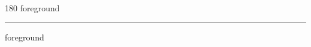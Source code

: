 
\begin{frame}
\begin{center}
\begin{turn}{180}
{\fontsize{2.5cm}{1em}\selectfont foreground}
\end{turn}
\vspace{1em}\par  
\hrule
\vspace{1em}\par  
{\fontsize{2.5cm}{1em}\selectfont foreground}
\end{center}
\end{frame}
